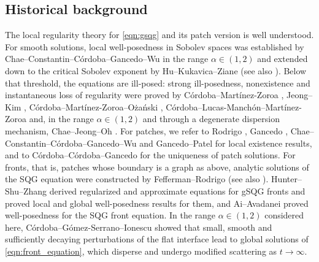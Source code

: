 \documentclass[11pt]{amsart}
\theoremstyle{definition}
\theoremstyle{remark}
\numberwithin{equation}{section}
\begin{document}
\subsection{Historical background}

The local regularity theory for \eqref{eqn:gsqg} and its patch version is well understood. For smooth solutions, local well-posedness in Sobolev spaces was established by Chae--Constantin--C\'ordoba--Gancedo--Wu \cite{Chae-Constantin-Cordoba-Gancedo-Wu:gsqg-singular-velocities} in the range $\alpha \in (1,2)$ and extended down to the critical Sobolev exponent by Hu--Kukavica--Ziane \cite{Hu-Kukavica-Ziane:local-existence-active-scalar} (see also \cite{Chae-Constantin-Wu:inviscid-models-2d-euler-sqg,Inci:well-posedness-sqg,Yu-Zhang:local-wellposedness-sqg}). Below that threshold, the equations are ill-posed: strong ill-posedness, nonexistence and instantaneous loss of regularity were proved by C\'ordoba--Mart\'inez-Zoroa \cite{Cordoba-MartinezZoroa:ill-posedness-sqg,Cordoba-MartinezZoroa:ill-posedness-gsqg}, Jeong--Kim \cite{Jeong-Kim:illposedness-sqg}, C\'ordoba--Mart\'inez-Zoroa--O\.za\'nski \cite{Cordoba-MartinezZoroa-Ozanski:instantaneous-loss-regularity-sqg}, C\'ordoba--Lucas-Manch\'on--Mart\'inez-Zoroa \cite{Cordoba-LucasManchon-MartinezZoroa:ill-posedness-gsqg-sobolev} and, in the range $\alpha \in (1,2)$ and through a degenerate dispersion mechanism, Chae--Jeong--Oh \cite{Chae-Jeong-Oh:illposedness-degenerate-dispersion-gsqg}. For patches, we refer to Rodrigo \cite{Rodrigo:evolution-sharp-fronts-qg}, Gancedo \cite{Gancedo:existence-alpha-patch-sobolev}, Chae--Constantin--C\'ordoba--Gancedo--Wu \cite{Chae-Constantin-Cordoba-Gancedo-Wu:gsqg-singular-velocities} and Gancedo--Patel \cite{Gancedo-Patel:local-existence-blowup-gsqg} for local existence results, and to C\'ordoba--C\'ordoba--Gancedo \cite{Cordoba-Cordoba-Gancedo:uniqueness-sqg-patch} for the uniqueness of patch solutions. For fronts, that is, patches whose boundary is a graph as above, analytic solutions of the SQG equation were constructed by Fefferman--Rodrigo \cite{Fefferman-Rodrigo:analytic-sharp-fronts-sqg} (see also \cite{Fefferman-Rodrigo:almost-sharp-fronts-sqg}). Hunter--Shu--Zhang \cite{Hunter-Shu:regularized-approximate-model-sqg,Hunter-Shu-Zhang:local-wellposedness-model-sqg,Hunter-Shu-Zhang:global-model-front-sqg,Hunter-Shu-Zhang:global-gsqg} derived regularized and approximate equations for gSQG fronts and proved local and global well-posedness results for them, and Ai--Avadanei \cite{Ai-Avadanei:well-posedness-sqg-front} proved well-posedness for the SQG front equation. In the range $\alpha \in (1,2)$ considered here, C\'ordoba--G\'omez-Serrano--Ionescu \cite{Cordoba-GomezSerrano-Ionescu:global-generalized-sqg-patch} showed that small, smooth and sufficiently decaying perturbations of the flat interface lead to global solutions of \eqref{eqn:front_equation}, which disperse and undergo modified scattering as $t \to \infty$.
\end{document}
